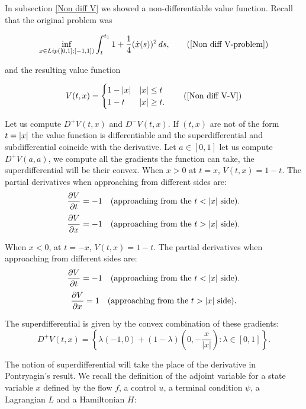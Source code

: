 \begin{example}
    In subsection \ref{Non diff V} we showed a non-differentiable value function. Recall that the original problem was
    
    \begin{equation}
        \inf_{x\in Lip([0,1];[-1,1])} \int_t^{t_1} 1 + \frac{1}{4}(\dot{x}(s))^2 \,ds,
        \tag{\ref{Non diff V-problem}}
    \end{equation}
    
    and the resulting value function
    
    \begin{equation}
        V(t,x)=\begin{cases}
            1-\abs{x} & \abs{x}\leq t \\
            1-t& \abs{x}\geq t.
        \end{cases}
        \tag{\ref{Non diff V-V}}
    \end{equation}

    Let us compute $D^+V(t,x)$ and $D^-V(t,x)$. If $(t,x)$ are not of the form $t=\abs{x}$ the value function is differentiable and the superdifferential and subdifferential coincide with the derivative. Let $a\in[0,1]$ let us compute $D^+V(a,a)$, we compute all the gradients the function can take, the superdifferential will be their convex. When \( x > 0 \) at \( t = x \), \( V(t, x) = 1 - t \). The partial derivatives when approaching from different sides are:
    \[
    \frac{\partial V}{\partial t} = -1 \quad \text{(approaching from the \( t < |x| \) side)}.
    \]
    \[
    \frac{\partial V}{\partial x} = -1 \quad \text{(approaching from the \( t > |x| \) side)}.
    \]
    
    When \( x < 0 \), at \( t = -x \), \( V(t, x) = 1 - t \). The partial derivatives when approaching from different sides are:
    \[
    \frac{\partial V}{\partial t} = -1 \quad \text{(approaching from the \( t < |x| \) side)}.
    \]
    \[
    \frac{\partial V}{\partial x} = 1 \quad \text{(approaching from the \( t > |x| \) side)}.
    \]
    
    The superdifferential is given by the convex combination of these gradients:
    \[
    D^+ V(t, x) = \left\{ \lambda(-1, 0) + (1 - \lambda)\left(0, -\frac{x}{|x|}\right) : \lambda \in [0, 1] \right\}.
    \]
      
\end{example}

The notion of superdifferential will take the place of the derivative in Pontryagin's result. We recall the definition of the adjoint variable for a state variable $x$ defined by the flow $f$, a control $u$, 
a terminal condition $\psi$, a Lagrangian $L$ and a Hamiltonian $H$:


